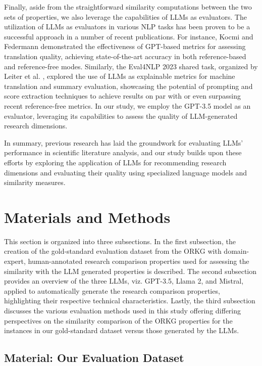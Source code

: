 Finally, aside from the straightforward similarity computations between the two sets of properties, we also leverage the capabilities of LLMs as evaluators. The utilization of LLMs as evaluators in various NLP tasks has been proven to be a successful approach in a number of recent publications. For instance, Kocmi and Federmann \cite{kocmi2023large} demonstrated the effectiveness of GPT-based metrics for assessing translation quality, achieving state-of-the-art accuracy in both reference-based and reference-free modes. Similarly, the Eval4NLP 2023 shared task, organized by Leiter et al. \cite{leiter2023eval4nlp}, explored the use of LLMs as explainable metrics for machine translation and summary evaluation, showcasing the potential of prompting and score extraction techniques to achieve results on par with or even surpassing recent reference-free metrics. In our study, we employ the GPT-3.5 model as an evaluator, leveraging its capabilities to assess the quality of LLM-generated research dimensions.

In summary, previous research has laid the groundwork for evaluating LLMs' performance in scientific literature analysis, and our study builds upon these efforts by exploring the application of LLMs for recommending research dimensions and evaluating their quality using specialized language models and similarity measures.

\section{Materials and Methods}

This section is organized into three subsections. In the first subsection, the creation of the gold-standard evaluation dataset from the ORKG with domain-expert, human-annotated research comparison properties used for assessing the similarity with the LLM generated properties is described. The second subsection provides an overview of the three LLMs, viz. GPT-3.5, Llama 2, and Mistral, applied to automatically generate the research comparison properties, highlighting their respective technical characteristics. Lastly, the third subsection discusses the various evaluation methods used in this study offering differing perspectives on the similarity comparison of the ORKG properties for the instances in our gold-standard dataset versus those generated by the LLMs.

\subsection{Material: Our Evaluation Dataset}
\label{sec:dataset}

